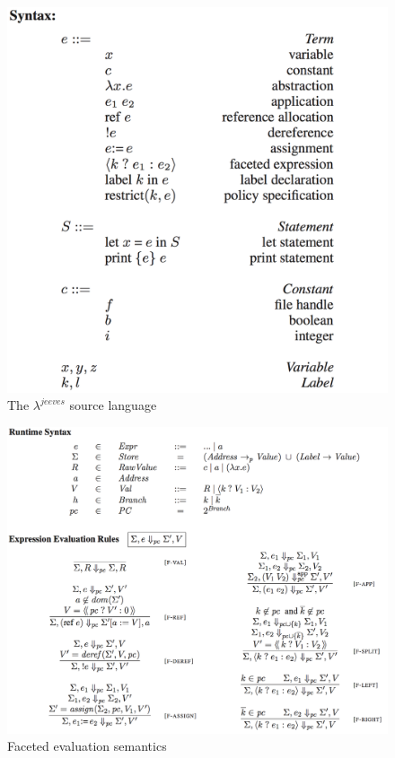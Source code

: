 \begin{figure}
	\centering
	\includegraphics[scale=0.25, frame]{images/lambdaJeeves.png}
	\caption{The $\lambda^{jeeves}$ source language~\cite{FacetedJeeves}}
	\label{fig:lambdaJeeves}
\end{figure}

\begin{figure}
	\centering
	\includegraphics[scale=0.25, frame]{images/facetEval.png}
	\caption{Faceted evaluation semantics~\cite{FacetedJeeves}}
	\label{fig:facetEval}
\end{figure}

